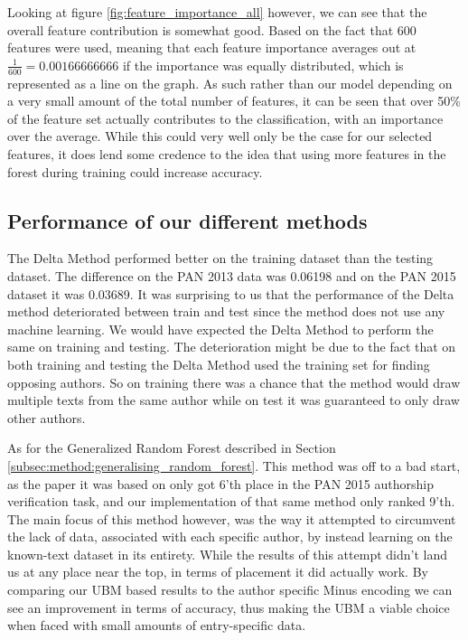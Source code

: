 Looking at figure \ref{fig:feature_importance_all} however, we can see that
the overall feature contribution is somewhat good. Based on the fact that
600 features were used, meaning that each feature importance averages out at
$\frac{1}{600} = 0.00166666666$ if the importance was equally distributed, which
is represented as a line on the graph. As such rather than our model depending
on a very small amount of the total number of features, it can be seen that
over 50\% of the feature set actually contributes to the classification, with
an importance over the average. While this could very well only be the case for
our selected features, it does lend some credence to the idea that using more
features in the forest during training could increase accuracy.

\subsection{Performance of our different methods}
The Delta Method performed better on the training dataset than the testing
dataset. The difference on the PAN 2013 data was 0.06198 and on the PAN 2015
dataset it was 0.03689. It was surprising to us that the performance of the
Delta method deteriorated between train and test since the method does not use
any machine learning. We would have expected the Delta Method to perform the
same on training and testing. The deterioration might be due to the fact that
on both training and testing the Delta Method used the training set for finding
opposing authors. So on training there was a chance that the method would draw
multiple texts from the same author while on test it was guaranteed to only draw
other authors.

As for the Generalized Random Forest described in Section
\ref{subsec:method:generalising_random_forest}. This method was off to a bad
start, as the paper it was based on \cite{pacheco2015} only got 6'th place in
the PAN 2015 authorship verification task, and our implementation of that same
method only ranked 9'th. The main focus of this method however, was the way it
attempted to circumvent the lack of data, associated with each specific author,
by instead learning on the known-text dataset in its entirety. While the results
of this attempt didn't land us at any place near the top, in terms of placement
it did actually work. By comparing our \gls{UBM} based results to the author
specific Minus encoding we can see an improvement in terms of accuracy,
thus making the \gls{UBM} a viable choice when faced with small amounts of
entry-specific data.

